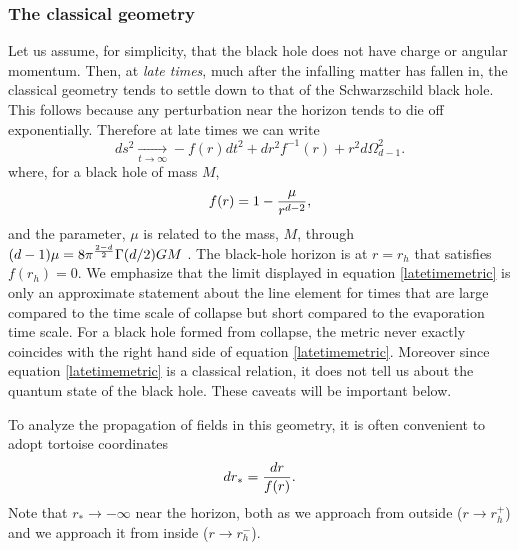 \documentclass[12pt]{article}
\def\gnewt{G}
\def\rtor{{r_*}}
\newcommand{\be}{\begin{equation}}
\newcommand{\ee}{\end{equation}}
\begin{document}
\subsubsection*{The classical geometry}
Let us assume, for simplicity, that the black hole does not have charge or angular momentum. Then,  at {\em late times}, much after the infalling matter has fallen in,  the classical geometry tends to settle down to that of the Schwarzschild black hole. This follows because any perturbation near the horizon tends to die off exponentially. Therefore at late times we can write
\be
\label{latetimemetric}
ds^2 \underset{t \rightarrow \infty}{\longrightarrow} -f(r) dt^2 + dr^2 f^{-1}(r) + r^2 d \Omega_{d-1}^2.
\ee
where, for a black hole of mass $M$,
\be
\label{fexplicit}
f(r) = {1 - {\mu \over r^{d-2}}},
\ee
and the parameter, $\mu$ is related to the mass, $M$,  through $(d-1) \mu = 8 \pi^{{2-d \over 2}} \Gamma(d/2)  \gnewt M$ \cite{lrr-2008-6}. The black-hole horizon is at $r = r_h$ that satisfies $f(r_h) = 0$.
We emphasize that the limit displayed in equation \eqref{latetimemetric} is only an approximate statement about the line element for times that are large compared to the time scale of collapse but short compared to the evaporation time scale. For a black hole formed from collapse, the metric never exactly coincides with the right hand side of equation \eqref{latetimemetric}. Moreover since equation \eqref{latetimemetric} is a classical relation,  it does not tell us about the quantum state of the black hole. These caveats will be important below.

To analyze the propagation of fields in this geometry, it is often convenient to adopt tortoise coordinates
\be
d \rtor = {d r \over f(r)}.
\ee
Note that $\rtor \rightarrow -\infty$ near the horizon, both as we approach from outside ($r \rightarrow r_h^+$) and we approach it from inside ($r \rightarrow r_h^-$).
\end{document}

